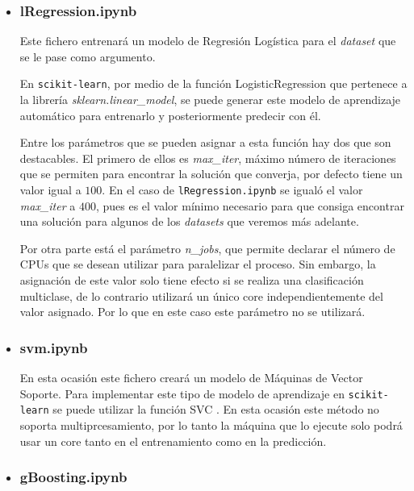 \documentclass[a4paper, 12pt]{book}
\begin{document}
\begin{itemize}

\item \subsubsection{lRegression.ipynb}
\label{subsubsec:lRegression}

Este fichero entrenará un modelo de Regresión Logística para el \textit{dataset} que se le pase como argumento.

En \texttt{scikit-learn}, por medio de la función LogisticRegression\cite{LogisticRegressionDoc} que pertenece a la librería \textit{sklearn.linear\_model}, se puede generar este modelo de aprendizaje automático para entrenarlo y posteriormente predecir con él. 

Entre los parámetros que se pueden asignar a esta función hay dos que son destacables. El primero de ellos es \textit{max\_iter}, máximo número de iteraciones que se permiten para encontrar la solución que converja, por defecto tiene un valor igual a $100$. En el caso de \texttt{lRegression.ipynb} se igualó el valor \textit{max\_iter} a $400$, pues es el valor mínimo necesario para que consiga encontrar una solución para algunos de los \textit{datasets} que veremos más adelante.

Por otra parte está el parámetro \textit{n\_jobs}, que permite declarar el número de CPUs que se desean utilizar para paralelizar el proceso. Sin embargo, la asignación de este valor solo tiene efecto si se realiza una clasificación multiclase, de lo contrario utilizará un único core independientemente del valor asignado. Por lo que en este caso este parámetro no se utilizará.

\item \subsubsection{svm.ipynb} 
\label{subsubsub:svm}

En esta ocasión este fichero creará un modelo de Máquinas de Vector Soporte. Para implementar este tipo de modelo de aprendizaje en \texttt{scikit-learn} se puede utilizar la función SVC \cite{SVMDocumentation}. En esta ocasión este método no soporta multiprcesamiento, por lo tanto la máquina que lo ejecute solo podrá usar un core tanto en el entrenamiento como en la predicción. 

\item \subsubsection{gBoosting.ipynb} 
\label{subsubsub:gBoosting}


\end{itemize}
\end{document}
